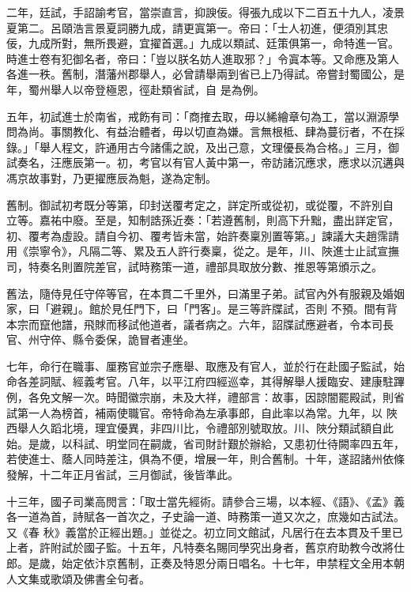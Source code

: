 \begin{pinyinscope}
 二年，廷試，手詔諭考官，當崇直言，抑諛佞。得張九成以下二百五十九人，凌景夏第二。呂頤浩言景夏詞勝九成，請更寘第一。帝曰：「士人初進，便須別其忠佞，九成所對，無所畏避，宜擢首選。」九成以類試、廷策俱第一，命特進一官。時進士卷有犯御名者，帝曰：「豈以朕名妨人進取邪？」令寘本等。又命應及第人各進一秩。舊制，潛藩州郡舉人，必曾請舉兩到省已上乃得試。帝嘗封蜀國公，是年，蜀州舉人以帝登極恩，徑赴類省試，自
 是為例。



 五年，初試進士於南省，戒飭有司：「商搉去取，毋以絺繪章句為工，當以淵源學問為尚。事關教化、有益治體者，毋以切直為嫌。言無根柢、肆為蔓衍者，不在採錄。」「舉人程文，許通用古今諸儒之說，及出己意，文理優長為合格。」三月，御試奏名，汪應辰第一。初，考官以有官人黃中第一，帝訪諸沉應求，應求以沉遘與馮京故事對，乃更擢應辰為魁，遂為定制。



 舊制。御試初考既分等第，印封送覆考定之，詳定所或從初，或從覆，不許別自
 立等。嘉祐中廢。至是，知制誥孫近奏：「若遵舊制，則高下升黜，盡出詳定官，初、覆考為虛設。請自今初、覆考皆未當，始許奏稟別置等第。」諫議大夫趙霈請用《崇寧令》，凡隔二等、累及五人許行奏稟，從之。是年，川、陜進士止試宣撫司，特奏名則置院差官，試時務策一道，禮部具取放分數、推恩等第頒示之。



 舊法，隨侍見任守倅等官，在本貫二千里外，曰滿里子弟。試官內外有服親及婚姻家，曰「避親」。館於見任門下，曰「門客」。是三等許牒試，否則
 不預。間有背本宗而竄他譜，飛賕而移試他道者，議者病之。六年，詔牒試應避者，令本司長官、州守倅、縣令委保，詭冒者連坐。



 七年，命行在職事、厘務官並宗子應舉、取應及有官人，並於行在赴國子監試，始命各差詞賦、經義考官。八年，以平江府四經巡幸，其得解舉人援臨安、建康駐蹕例，各免文解一次。時聞徽宗崩，未及大祥，禮部言：故事，因諒闇罷殿試，則省試第一人為榜首，補兩使職官。帝特命為左承事郎，自此率以為常。九年，以
 陜西舉人久蹈北境，理宜優異，非四川比，令禮部別號取放。川、陜分類試額自此始。是歲，以科試、明堂同在嗣歲，省司財計艱於辦給，又患初仕待闕率四五年，若使進士、蔭人同時差注，俱為不便，增展一年，則合舊制。十年，遂詔諸州依條發解，十二年正月省試，三月御試，後皆準此。



 十三年，國子司業高閌言：「取士當先經術。請參合三場，以本經、《語》、《孟》義各一道為首，詩賦各一首次之，子史論一道、時務策一道又次之，庶幾如古試法。又《春
 秋》義當於正經出題。」並從之。初立同文館試，凡居行在去本貫及千里已上者，許附試於國子監。十五年，凡特奏名賜同學究出身者，舊京府助教今改將仕郎。是歲，始定依汴京舊制，正奏及特恩分兩日唱名。十七年，申禁程文全用本朝人文集或歌頌及佛書全句者。




\end{pinyinscope}
